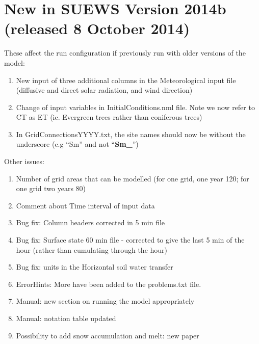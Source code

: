\documentclass[letterpaper,10pt,english]{sphinxmanual}
\begin{document}
\section{New in SUEWS Version 2014b (released 8 October 2014)}
\label{\detokenize{version-history:new-in-suews-version-2014b-released-8-october-2014}}
These affect the run configuration if previously run with older versions
of the model:
\begin{enumerate}
\item {} 
New input of three additional columns in the Meteorological input
file (diffusive and direct solar radiation, and wind direction)

\item {} 
Change of input variables in InitialConditions.nml file. Note we now
refer to CT as ET (ie. Evergreen trees rather than coniferous trees)

\item {} 
In GridConnectionsYYYY.txt, the site names should now be without the
underscore (e.g “Sm” and not “{\color{red}\bfseries{}Sm\_}”)

\end{enumerate}

Other issues:
\begin{enumerate}
\item {} 
Number of grid areas that can be modelled (for one grid, one year
120; for one grid two years 80)

\item {} 
Comment about Time interval of input data

\item {} 
Bug fix: Column headers corrected in 5 min file

\item {} 
Bug fix: Surface state 60 min file - corrected to give the last 5 min
of the hour (rather than cumulating through the hour)

\item {} 
Bug fix: units in the Horizontal soil water transfer

\item {} 
ErrorHints: More have been added to the problems.txt file.

\item {} 
Manual: new section on running the model appropriately

\item {} 
Manual: notation table updated

\item {} 
Possibility to add snow accumulation and melt: new paper

\end{enumerate}
\end{document}
